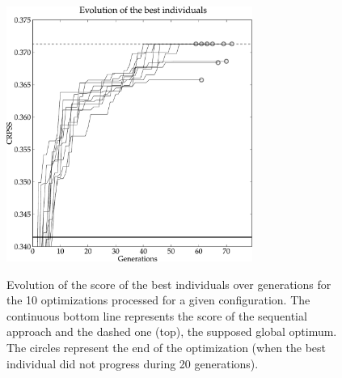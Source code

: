 \documentclass{ametsoc}
\begin{document}
\begin{figure}[t]
	\begin{center}
		\noindent\includegraphics[width=19pc,angle=0]{fig03.pdf}\\
	\end{center}
	\caption{Evolution of the score of the best individuals over generations for the 10 optimizations processed for a given configuration. The continuous bottom line represents the score of the sequential approach and the dashed one (top), the supposed global optimum. The circles represent the end of the optimization (when the best individual did not progress during 20 generations).}
	\label{fig:gas_evolution_good}
\end{figure}
\end{document}
